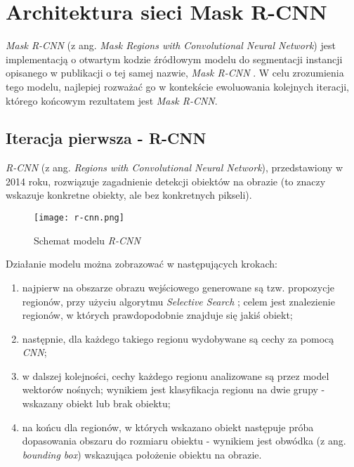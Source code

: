 \section{Architektura sieci Mask R-CNN}
\label{sec:architekrura_mask_rcnn}

\textit{Mask R-CNN} \cite{matterport-mask-rcnn} (z ang. \textit{Mask Regions with Convolutional Neural Network}) jest implementacją o otwartym kodzie źródłowym modelu do segmentacji instancji opisanego w publikacji o tej samej nazwie, \textit{Mask R-CNN} \cite{general-mask-rcnn}.
W celu zrozumienia tego modelu, najlepiej rozważać go w kontekście ewoluowania kolejnych iteracji, którego końcowym rezultatem jest \textit{Mask R-CNN}.

\subsection{Iteracja pierwsza - R-CNN}

\textit{R-CNN} \cite{rcnn} (z ang. \textit{Regions with Convolutional Neural Network}), przedstawiony w 2014 roku, rozwiązuje zagadnienie detekcji obiektów na obrazie (to znaczy wskazuje konkretne obiekty, ale bez konkretnych pikseli).

\begin{figure}[h]
  \centering
  \caption{Schemat modelu \textit{R-CNN}}
  \texttt{[image: r-cnn.png]}
  \label{fig:r_cnn}
\end{figure}

Działanie modelu można zobrazować w następujących krokach:

\begin{enumerate}
  \item najpierw na obszarze obrazu wejściowego generowane są tzw. propozycje regionów, przy użyciu algorytmu \textit{Selective Search} \cite{selective-search}; celem jest znalezienie regionów, w których prawdopodobnie znajduje się jakiś obiekt;
	\item następnie, dla każdego takiego regionu wydobywane są cechy za pomocą \textit{CNN};
  \item w dalszej kolejności, cechy każdego regionu analizowane są przez model wektorów nośnych; wynikiem jest klasyfikacja regionu na dwie grupy - wskazany obiekt lub brak obiektu;
	\item na końcu dla regionów, w których wskazano obiekt następuje próba dopasowania obszaru do rozmiaru obiektu - wynikiem jest obwódka (z ang. \textit{bounding box}) wskazująca położenie obiektu na obrazie.
\end{enumerate}

